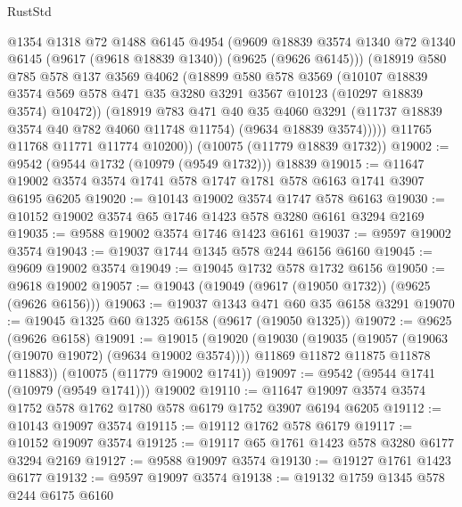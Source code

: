 \begin{lexlean}{RustStd}
\begin{coremodule}
{\begin{coremodule}
{{{{{{{{{{{{{{{{{{{{{{{{{{{{{{{{{            @1354
            @1318
            @72
            @1488
            @6145
            @4954
            (@9609
              @18839
              @3574
              @1340
              @72
              @1340
              @6145
              (@9617 (@9618 @18839 @1340))
              (@9625 (@9626 @6145)))
            (@18919
              @580
              @785
              @578
              @137
              @3569
              @4062
              (@18899
                @580
                @578
                @3569
                (@10107
                  @18839
                  @3574
                  @569
                  @578
                  @471
                  @35
                  @3280
                  @3291
                  @3567
                  @10123
                  (@10297 @18839 @3574)
                  @10472))
              (@18919
                @783
                @471
                @40
                @35
                @4060
                @3291
                (@11737 @18839 @3574 @40 @782 @4060 @11748 @11754)
                (@9634 @18839 @3574)))))
        @11765
        @11768
        @11771
        @11774
        @10200))
    (@10075 (@11779 @18839 @1732))
@19002 := @9542 (@9544 @1732 (@10979 (@9549 @1732))) @18839
@19015 := @11647 @19002 @3574 @3574 @1741 @578 @1747 @1781 @578 @6163 @1741 @3907 @6195 @6205
@19020 := @10143 @19002 @3574 @1747 @578 @6163
@19030 := @10152 @19002 @3574 @65 @1746 @1423 @578 @3280 @6161 @3294 @2169
@19035 := @9588 @19002 @3574 @1746 @1423 @6161
@19037 := @9597 @19002 @3574
@19043 := @19037 @1744 @1345 @578 @244 @6156 @6160
@19045 := @9609 @19002 @3574
@19049 := @19045 @1732 @578 @1732 @6156
@19050 := @9618 @19002
@19057 := @19043 (@19049 (@9617 (@19050 @1732)) (@9625 (@9626 @6156)))
@19063 := @19037 @1343 @471 @60 @35 @6158 @3291
@19070 := @19045 @1325 @60 @1325 @6158 (@9617 (@19050 @1325))
@19072 := @9625 (@9626 @6158)
@19091 := @19015
    (@19020
      (@19030
        (@19035 (@19057 (@19063 (@19070 @19072) (@9634 @19002 @3574))))
        @11869
        @11872
        @11875
        @11878
        @11883))
    (@10075 (@11779 @19002 @1741))
@19097 := @9542 (@9544 @1741 (@10979 (@9549 @1741))) @19002
@19110 := @11647 @19097 @3574 @3574 @1752 @578 @1762 @1780 @578 @6179 @1752 @3907 @6194 @6205
@19112 := @10143 @19097 @3574
@19115 := @19112 @1762 @578 @6179
@19117 := @10152 @19097 @3574
@19125 := @19117 @65 @1761 @1423 @578 @3280 @6177 @3294 @2169
@19127 := @9588 @19097 @3574
@19130 := @19127 @1761 @1423 @6177
@19132 := @9597 @19097 @3574
@19138 := @19132 @1759 @1345 @578 @244 @6175 @6160
}}}}}}}}}}}}}}}}}}}}}}}}}}}}}}}}}
\end{coremodule}}
\end{coremodule}
\end{lexlean}
